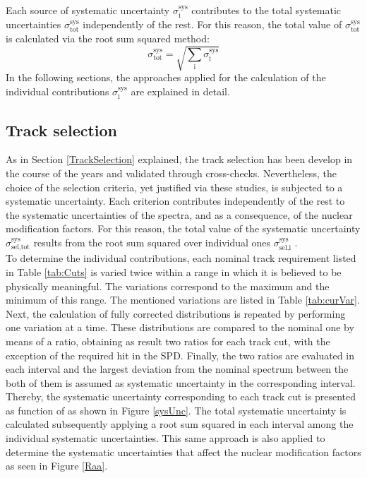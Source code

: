 \documentclass[12pt,a4paper]{report}
\begin{document}
Each source of systematic uncertainty $\sigma^\text{sys}_\text{i}$ contributes to the total systematic uncertainties $\sigma^\text{sys}_\text{tot}$ independently of the rest. For this reason, the total value of $\sigma^\text{sys}_\text{tot}$ is calculated via the root sum squared method:
\begin{equation}
\sigma^\text{sys}_\text{tot} = \sqrt{\sum_{\text{i}}\sigma^\text{sys}_\text{i}}
\end{equation}
In the following sections, the approaches applied for the calculation of the individual contributions $\sigma^\text{sys}_\text{i}$ are explained in detail. 
\subsection{Track selection} 
As in Section \ref{TrackSelection} explained, the track selection has been develop in the course of the years and validated through cross-checks. Nevertheless, the choice of the selection criteria, yet justified via these studies, is subjected to a systematic uncertainty. Each criterion contributes independently of the rest to the systematic uncertainties of the \pt spectra, and as a consequence, of the nuclear modification factors. For this reason, the total value of the systematic uncertainty $\sigma^\text{sys}_\text{sel,tot}$ results from the root sum squared over individual ones $\sigma^\text{sys}_\text{sel,i}$ .\\
To determine the individual contributions, each nominal track requirement listed in Table \ref{tab:Cuts} is varied twice within a range in which it is believed to be physically meaningful. The variations correspond to the maximum and the minimum of this range. The mentioned variations are listed in Table \ref{tab:curVar}. Next, the calculation of fully corrected \pt distributions is repeated by performing one variation at a time. These \pt distributions are compared to the nominal one by means of a ratio, obtaining as result two ratios for each track cut, with the exception of the required hit in the SPD. Finally, the two ratios are evaluated in each \pt interval and the largest deviation from the nominal \pt spectrum between the both of them is assumed as systematic uncertainty in the corresponding \pt interval. Thereby, the systematic uncertainty corresponding to each track cut is presented as function of \pt as shown in Figure \ref{sysUnc}. The total systematic uncertainty is calculated subsequently applying a root sum squared in each \pt interval among the individual systematic uncertainties. This same approach is also applied to determine the systematic uncertainties that affect the nuclear modification factors as seen in Figure \ref{Raa}.\\
\end{document}

